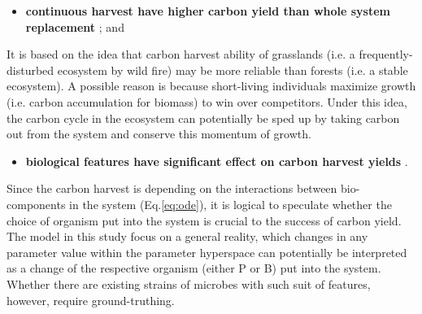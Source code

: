 \documentclass[../thesis.tex]{subfiles} %
\begin{document}
\begin{itemize}
    \item \textbf{
    continuous harvest have higher carbon yield than whole system replacement
    }; and
\end{itemize}

It is based on the idea that carbon harvest ability of grasslands (i.e. a frequently-disturbed ecosystem by wild fire) may be more reliable than forests (i.e. a stable ecosystem).\autocite{dass2018grasslands}  A possible reason is because short-living individuals maximize growth (i.e. carbon accumulation for biomass) to win over competitors.  Under this idea, the carbon cycle in the ecosystem can potentially be sped up by taking carbon out from the system and conserve this momentum of growth.

\begin{itemize}
    \item \textbf{
    biological features have significant effect on carbon harvest yields
    }.
\end{itemize}

Since the carbon harvest is depending on the interactions between bio-components in the system (Eq.\ref{eq:ode}), it is logical to speculate whether the choice of organism put into the system is crucial to the success of carbon yield.  The model in this study focus on a general reality, which changes in any parameter value within the parameter hyperspace can potentially be interpreted as a change of the respective organism (either P or B) put into the system.  Whether there are existing strains of microbes with such suit of features, however, require ground-truthing.
\end{document}
